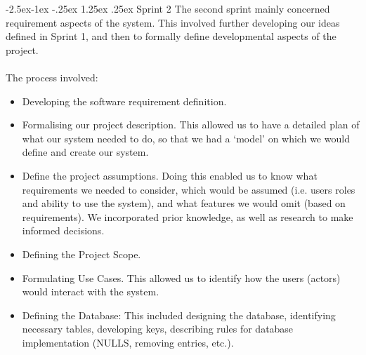 \documentclass[paper=a4, fontsize=11pt]{scrartcl}
\makeatletter
\numberwithin{equation}{section}		%
\numberwithin{figure}{section}			%
\numberwithin{table}{section}				%
\renewcommand\paragraph{\@startsection{paragraph}{4}{\z@}%
            {-2.5ex\@plus -1ex \@minus -.25ex}%
            {1.25ex \@plus .25ex}%
            {\normalfont\normalsize\bfseries}}
\makeatother
\begin{document}
\paragraph{Sprint 2}
The second sprint mainly concerned requirement aspects of the system. This involved further developing our ideas defined in Sprint 1, and then to formally define developmental aspects of the project.\\\\The process involved:
\begin{itemize}
\item Developing the software requirement definition.
\item Formalising our project description. This allowed us to have a detailed plan of what our system needed to do, so that we had a ‘model’ on which we would define and create our system.
\item Define the project assumptions. Doing this enabled us to know what requirements we needed to consider, which would be assumed (i.e. users roles and ability to use the system), and what features we would omit (based on requirements). We incorporated prior knowledge, as well as research to make informed decisions.
\item Defining the Project Scope.
\item Formulating Use Cases. This allowed us to identify how the users (actors) would interact with the system.
\item Defining the Database: This included designing the database, identifying necessary tables, developing keys, describing rules for database implementation (NULLS, removing entries, etc.).
\end{itemize}
\end{document}
